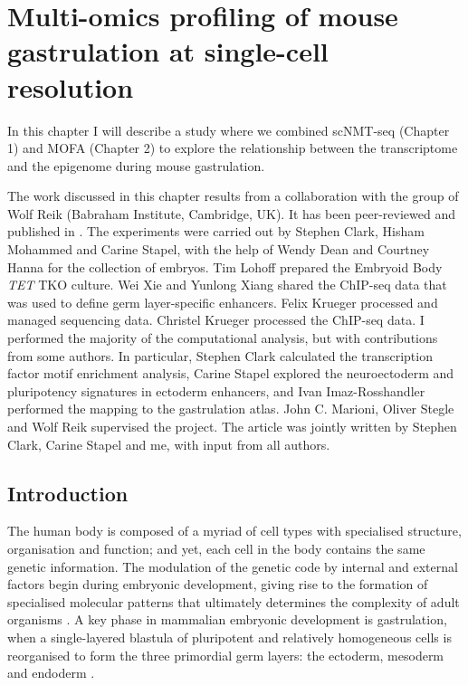 \graphicspath{{Chapter3/Figs/}}

\chapter{Multi-omics profiling of mouse gastrulation at single-cell resolution}

In this chapter I will describe a study where we combined scNMT-seq (Chapter 1) and MOFA (Chapter 2) to explore the relationship between the transcriptome and the epigenome during mouse gastrulation.

The work discussed in this chapter results from a collaboration with the group of Wolf Reik (Babraham Institute, Cambridge, UK). It has been peer-reviewed and published in \cite{Argelaguet2019}. The experiments were carried out by Stephen Clark, Hisham Mohammed and Carine Stapel, with the help of Wendy Dean and Courtney Hanna for the collection of embryos. Tim Lohoff prepared the Embryoid Body \textit{TET} TKO culture. Wei Xie and Yunlong Xiang shared the ChIP-seq data that was used to define germ layer-specific enhancers. Felix Krueger processed and managed sequencing data. Christel Krueger processed the ChIP-seq data. I performed the majority of the computational analysis, but with contributions from some authors. In particular, Stephen Clark calculated the transcription factor motif enrichment analysis, Carine Stapel explored the neuroectoderm and pluripotency signatures in ectoderm enhancers, and Ivan Imaz-Rosshandler performed the mapping to the gastrulation atlas. John C. Marioni, Oliver Stegle and Wolf Reik supervised the project. The article was jointly written by Stephen Clark, Carine Stapel and me, with input from all authors.

\section{Introduction}

The human body is composed of a myriad of cell types with specialised structure, organisation and function; and yet, each cell in the body contains the same genetic information. The modulation of the genetic code by internal and external factors begin during embryonic development, giving rise to the formation of specialised molecular patterns that ultimately determines the complexity of adult organisms \cite{Rosalind2018}. A key phase in mammalian embryonic development is gastrulation, when a single-layered blastula of pluripotent and relatively homogeneous cells is reorganised to form the three primordial germ layers: the ectoderm, mesoderm and endoderm \cite{Tam1997, Solnica-Krezel2012, Tam2007}.

